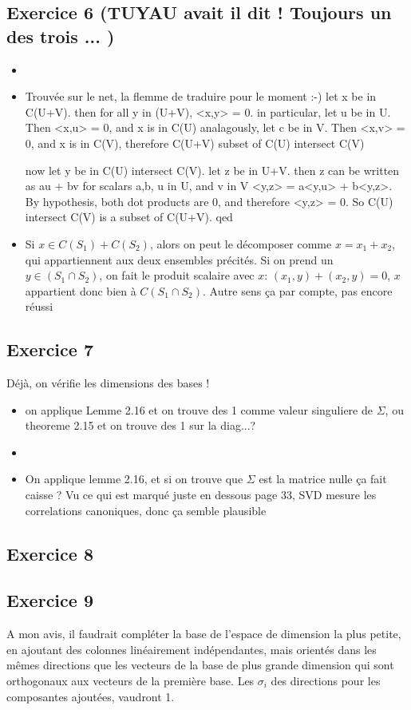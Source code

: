 \subsection*{Exercice 6 (TUYAU avait il dit ! Toujours un des trois ... ) }
\begin{itemize}
\item
\item Trouvée sur le net, la flemme de traduire pour le moment :-)
let x be in C(U+V). then for all y in (U+V), <x,y> = 0.
in particular, let u be in U. Then <x,u> = 0, and x is in C(U)
analagously, let c be in V. Then <x,v> = 0, and x is in C(V),
therefore C(U+V) subset of C(U) intersect C(V)

now let y be in C(U) intersect C(V). let z be in U+V. then z can be written as au + bv for scalars a,b, u in U, and v in V
<y,z> = a<y,u> + b<y,z>. By hypothesis, both dot products are 0, and therefore <y,z> = 0. So C(U) intersect C(V) is a subset of C(U+V). qed
\item
Si $x\in C(S_1)+C(S_2)$, alors on peut le décomposer comme $x=x_1+x_2$, qui appartiennent aux deux ensembles précités. Si on prend un $y\in (S_1\cap S_2)$, on fait le produit scalaire avec $x$: $ (x_1,y)+(x_2,y)=0$, $x$ appartient donc bien à $C(S_1 \cap S_2)$.
Autre sens ça par compte, pas encore réussi
\end{itemize}
\subsection*{Exercice 7}
Déjà, on vérifie les dimensions des bases !
\begin{itemize}
\item on applique Lemme 2.16 et on trouve des 1 comme valeur singuliere de $\Sigma$, ou theoreme 2.15 et on trouve des 1 sur la diag...?
\item
\item On applique lemme 2.16, et si on trouve que $\Sigma$ est la matrice nulle ça fait caisse ? Vu ce qui est marqué juste en dessous page 33, SVD mesure les correlations canoniques, donc ça semble plausible
\end{itemize}
\subsection*{Exercice 8}


\subsection*{Exercice 9}
A mon avis, il faudrait compléter la base de l'espace de dimension la plus petite, en ajoutant des colonnes linéairement indépendantes, mais orientés dans les mêmes directions que les vecteurs de la base de plus grande dimension qui sont orthogonaux aux vecteurs de la première base. Les $\sigma_i$ des directions pour les composantes ajoutées, vaudront 1.

